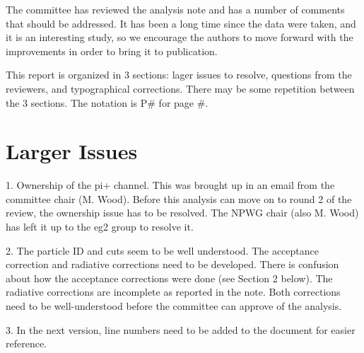 \documentclass[12pt]{article}
\begin{document}
\pagestyle{plain}
\setcounter{page}{2}

The committee has reviewed the analysis note and has a number of comments that should be 
addressed.  It has been a long time since the data were taken, and it is an interesting study, so 
we encourage the authors to move forward with the improvements in order to bring it to 
publication.

This report is organized in 3 sections: lager issues to resolve, questions from the reviewers, and 
typographical corrections.  There may be some repetition between the 3 sections.  The notation 
is P\# for page \#.

\section{Larger Issues }
1.
Ownership of the pi+ channel.  This was brought up in an email from the committee chair 
(M. Wood).  Before this analysis can move on to round 2 of the review, the ownership issue 
has to be resolved.  The NPWG chair (also M. Wood) has left it up to the eg2 group to 
resolve it.



2.
The particle ID and cuts seem to be well understood.  The acceptance correction and 
radiative corrections need to be developed.  There is confusion about how the acceptance 
corrections were done (see Section 2 below).  The radiative corrections are incomplete as 
reported in the note.  Both corrections need to be well-understood before the committee can 
approve of the analysis.



3.
In the next version, line numbers need to be added to the document for easier reference.
\end{document}
